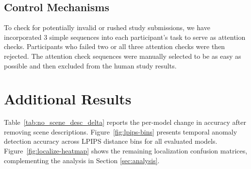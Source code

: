\documentclass[11pt]{article}
\begin{document}
\subsection{Control Mechanisms}

To check for potentially invalid or rushed study submissions, we have incorporated 3 simple sequences into each participant's task to serve as attention checks. Participants who failed two or all three attention checks were then rejected. The attention check sequences were manually selected to be as easy as possible and then excluded from the human study results.

\section{Additional Results}
\label{appendix:additional-results}

Table~\ref{tab:no_scene_desc_delta} reports the per-model change in accuracy after removing scene descriptions. Figure~\ref{fig:lpips-bins} presents temporal anomaly detection accuracy across LPIPS distance bins for all evaluated models. Figure~\ref{fig:localize-heatmap} shows the remaining localization confusion matrices, complementing the analysis in Section \ref{sec:analysis}.
\end{document}
